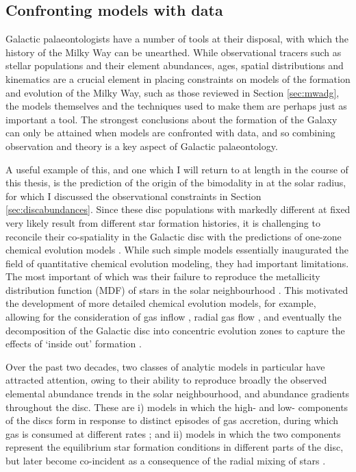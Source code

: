 \subsection{Confronting models with data}

Galactic palaeontologists have a number of tools at their disposal, with which the history of the Milky Way can be unearthed. While observational tracers such as stellar populations and their element abundances, ages, spatial distributions and kinematics are a crucial element in placing constraints on models of the formation and evolution of the Milky Way, such as those reviewed in Section \ref{sec:mwadg}, the models themselves and the techniques used to make them are perhaps just as important a tool. The strongest conclusions about the formation of the Galaxy can only be attained when models are confronted with data, and so combining observation and theory is a key aspect of Galactic palaeontology.

A useful example of this, and one which I will return to at length in the course of this thesis, is the prediction of the origin of the bimodality in \afe{} at the solar radius, for which I discussed the observational constraints in Section \ref{sec:discabundances}. Since these disc populations with markedly different \afe{} at fixed \feh{} very likely result from different star formation histories, it is challenging to reconcile their co-spatiality in the Galactic disc with the predictions of one-zone chemical evolution models \citep[e.g.,][]{1959ApJ...129..243S,1963ApJ...137..758S}. While such simple models essentially inaugurated the field of quantitative chemical evolution modeling, they had important limitations.  The most important of which was their failure to reproduce the metallicity distribution function (MDF) of stars in the solar neighbourhood \citep[known as the `G-dwarf problem',][]{1962AJ.....67..486V,1963ApJ...137..758S}. This motivated the development of more detailed chemical evolution models, for example, allowing for the consideration of gas inflow \citep{1972Natur.236...21L,1977ApJ...216..548T}, radial gas flow \citep[e.g.][]{2000A&A...355..929P}, and eventually the decomposition of the Galactic disc into concentric evolution zones to capture the effects of `inside out' formation \citep[e.g.][]{1976MNRAS.176...31L,1980FCPh....5..287T,1989MNRAS.239..885M}. 

Over the past two decades, two classes of analytic models in particular have attracted attention, owing to their ability to reproduce broadly the observed elemental abundance trends in the solar neighbourhood, and abundance gradients throughout the disc. These are i) models in which the high- and low-\afe{} components of the discs form in response to distinct episodes of gas accretion, during which gas is consumed at different rates \citep{1997ApJ...477..765C,2001ApJ...554.1044C,2009IAUS..254..191C}; and ii) models in which the two components represent the equilibrium star formation conditions in different parts of the disc, but later become co-incident as a consequence of the radial mixing of stars \citep{2009MNRAS.396..203S,2009MNRAS.399.1145S}. 

